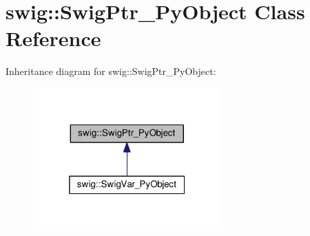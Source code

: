 \hypertarget{classswig_1_1SwigPtr__PyObject}{}\section{swig\+:\+:Swig\+Ptr\+\_\+\+Py\+Object Class Reference}
\label{classswig_1_1SwigPtr__PyObject}


Inheritance diagram for swig\+:\+:Swig\+Ptr\+\_\+\+Py\+Object\+:\nopagebreak
\begin{figure}[H]
\begin{center}
\leavevmode
\includegraphics[width=205pt]{classswig_1_1SwigPtr__PyObject__inherit__graph}
\end{center}
\end{figure}
